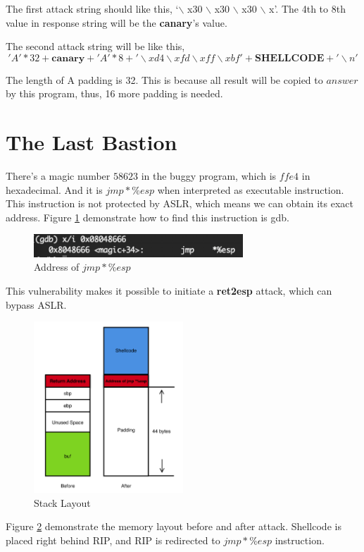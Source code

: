 \documentclass{article}
\begin{document}
The first attack string should like this, `$\backslash$ x30 $\backslash$ x30 $\backslash$ x30 $\backslash$ x'. The 4th to 8th value in response string will be the \textbf{canary}'s value.

The second attack string will be like this,
\[
 'A' * 32 + \textbf{canary} +  'A' * 8 + '\backslash xd4 \backslash xfd \backslash xff \backslash xbf' + \textbf{SHELLCODE} + '\backslash n'
 \]

The length of A padding is 32. This is because all result will be copied to $answer$ by this program, thus, 16 more padding is needed.

\newpage
\section{The Last Bastion}

There's a magic number $58623$ in the buggy program, which is $ffe4$ in hexadecimal. And it is $jmp  *\%esp$ when interpreted as executable instruction. This instruction is not protected by ASLR, which means we can obtain its exact address. Figure \ref{fig:gdb5} demonstrate how to find this instruction is gdb. 

\begin{figure}[h]
\centering
\includegraphics[width=0.7\textwidth]{gdb5.png}
\caption{\label{fig:gdb5}Address of  $jmp *\%esp$}
\end{figure}

This vulnerability makes it possible to initiate a \textbf{ret2esp} attack, which can bypass ASLR.

\begin{figure}[h]
\centering
\includegraphics[width=0.5\textwidth]{stack5.png}
\caption{\label{fig:stack5}Stack Layout}
\end{figure}

Figure \ref{fig:stack5} demonstrate the memory layout before and after attack. Shellcode is placed right behind RIP, and RIP is redirected to  $jmp  *\%esp$ instruction.
\end{document}
